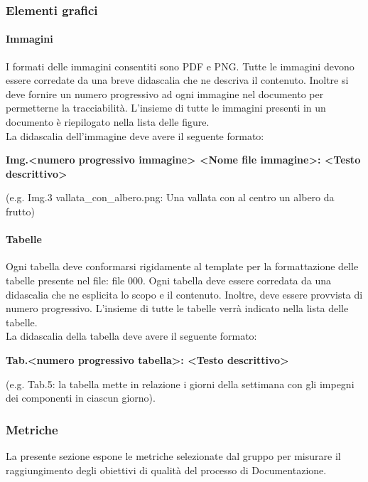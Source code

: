		\subsubsection{Elementi grafici}
			\paragraph{Immagini}
				I formati delle immagini consentiti sono PDF e PNG. Tutte le immagini devono essere corredate da una breve didascalia che ne descriva il contenuto. Inoltre si deve fornire un numero progressivo ad ogni immagine nel documento per permetterne la tracciabilità. L’insieme di tutte le immagini presenti in un documento è riepilogato nella lista delle figure. \\
				La didascalia dell’immagine deve avere il seguente formato:
				\begin{center}
					\textbf{Img.<numero progressivo immagine> <Nome file immagine>: <Testo descrittivo>}
				\end{center}
				(e.g.  Img.3 vallata\_con\_albero.png: Una vallata con al centro un albero da frutto)
			\paragraph{Tabelle}
				Ogni tabella deve conformarsi rigidamente al template per la formattazione delle tabelle presente nel file: file 000. Ogni tabella deve essere corredata da una didascalia che ne esplicita lo scopo e il contenuto. Inoltre, deve essere provvista di numero progressivo. L’insieme di tutte le tabelle verrà indicato nella lista delle tabelle. \\
				La didascalia della tabella deve avere il seguente formato: \\
				\begin{center}
					\textbf{Tab.<numero progressivo tabella>: <Testo descrittivo>}
				\end{center}
				(e.g. Tab.5: la tabella mette in relazione i giorni della settimana con gli impegni dei componenti in ciascun giorno).

		\subsubsection{Metriche}
			La presente sezione espone le metriche selezionate dal gruppo per misurare il raggiungimento degli obiettivi di qualità del processo di Documentazione. \\
